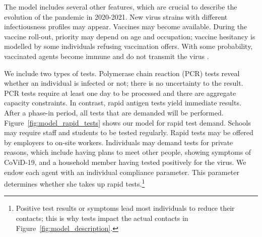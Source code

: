 The model includes several other features, which are crucial to describe the evolution
of the pandemic in 2020-2021. New virus strains with different infectiousness profiles
may appear. Vaccines may become available. During the vaccine roll-out, priority may
depend on age and occupation; vaccine hesitancy is modelled by some individuals refusing
vaccination offers. With some probability, vaccinated agents become immune and do not
transmit the virus \citep{Hunter2021, LevineTiefenbrun2021, Petter2021, Pritchard2021}.

We include two types of tests. Polymerase chain reaction (PCR) tests reveal whether an
individual is infected or not; there is no uncertainty to the result. PCR tests require
at least one day to be processed and there are aggregate capacity constraints. In
contrast, rapid antigen tests yield immediate results.
\label{r.1.a} After a phase-in period, all
tests that are demanded will be performed. Figure~\ref{fig:model_rapid_tests} shows our
model for rapid test demand. Schools may require staff and students to be tested
regularly. Rapid tests may be offered by employers to on-site workers. Individuals may
demand tests for private reasons, which include having plans to meet other people,
showing symptoms of CoViD-19, and a household member having tested positively for the
virus. We endow each agent with an individual compliance parameter. This parameter
determines whether she takes up rapid tests.\footnote{Positive test results or symptoms
    lead most individuals to reduce their contacts; this is why tests impact the actual
    contacts in Figure~\ref{fig:model_description}.}

